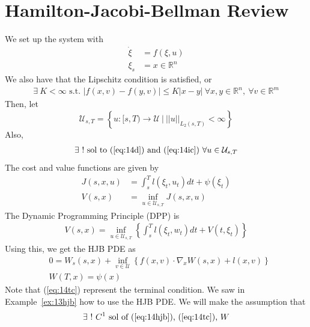 \mainmatter%
\setcounter{page}{1}

\lectureseries[\course]{\course}

\date{November 17, 2009}

\setaddress%

\setcounter{lecture}{13}
\setcounter{chapter}{13}


\section{Hamilton-Jacobi-Bellman Review}

We set up the system with
\begin{align}
\label{eq:14d}
\dot{\xi} &= f(\xi,u) \\
\label{eq:14ic}
\xi_s &= x\in\mathbb{R}^n
\end{align}
We also have that the Lipschitz condition is satisfied, or
\begin{align}
\label{eq:14l}
\exists~K<\infty \text{~s.t.~} |f(x,v)-f(y,v)| \leq K|x-y|~\forall x,y\in\mathbb{R}^n,~\forall v\in\mathbb{R}^m
\end{align}
Then, let
$$\mathcal{U}_{s,T} = \left\lbrace u:[s,T)\to\mathcal{U}~|~||u||_{L_2(s,T)}<\infty \right\rbrace$$%
Also,
\begin{align}
\label{eq:14cset}
\exists~! \text{~sol~to~(\ref{eq:14d})~and~(\ref{eq:14ic}) } \forall u\in\mathcal{U}_{s,T}
\end{align}
The cost and value functions are given by
\begin{align*}
J(s,x,u) &= \int_s^T l(\xi_t,u_t)dt + \psi(\xi_t) \\
V(s,x) &= \inf_{u\in\mathcal{U}_{s,T}} J(s,x,u)
\end{align*}
The Dynamic Programming Principle (DPP) is
\begin{align}
\label{eq:14dpp}
V(s,x) = \inf_{u\in\mathcal{U}_{s,T}} \left\lbrace \int_s^T l(\xi_t,w_t)dt + V(t,\xi_t) \right\rbrace
\end{align}
Using this, we get the HJB PDE as
\begin{align}
\label{eq:14hjb}
&0 = W_s(s,x) + \inf_{v\in\mathcal{U}} \left\lbrace f(x,v)\cdot\nabla_x W(s,x)+l(x,v) \right\rbrace \\
\label{eq:14tc}
&W(T,x) = \psi(x)
\end{align}
Note that (\ref{eq:14tc}) represent the terminal condition.
We saw in Example~\ref{ex:13hjb} how to use the HJB PDE\@.
We will make the assumption that
\begin{align}
\label{eq:14ae}
\exists~!~C^1 \text{~sol~of~(\ref{eq:14hjb}),~(\ref{eq:14tc}), } W
\end{align}

